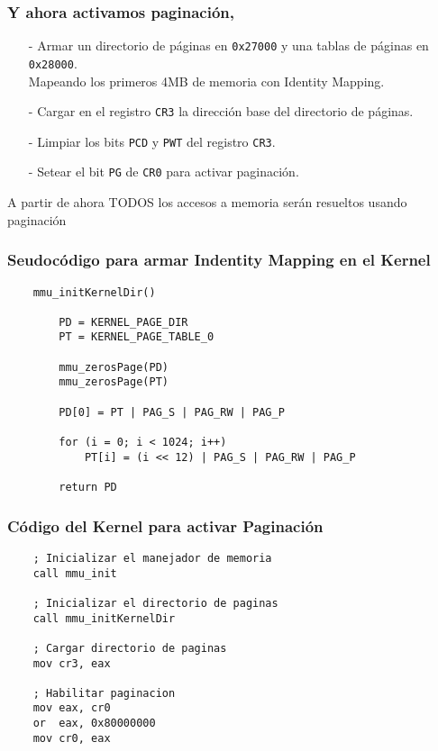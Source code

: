 \documentclass[aspectratio=169]{beamer}
\begin{document}
\begin{frame}
    \frametitle{Y ahora activamos paginación,}
    \begin{itemize}
    \setlength\itemsep{0.7cm}
    \item[-] Armar un directorio de páginas en \texttt{0x27000} y una tablas de páginas en \texttt{0x28000}.\\
    Mapeando los primeros 4MB de memoria con Identity Mapping.
    \pause
    \item[-] Cargar en el registro \texttt{CR3} la dirección base del directorio de páginas.
    \pause
    \item[-] Limpiar los bits \texttt{PCD} y \texttt{PWT} del registro \texttt{CR3}.
    \pause
    \item[-] Setear el bit \texttt{PG} de \texttt{CR0} para activar paginación.
    \end{itemize}
    \pause
    \vspace{0.3cm}
    \begin{center}
    \large
    \textcolor{verdeuca}{A partir de ahora TODOS los accesos a memoria serán resueltos usando paginación}
    \end{center}
\end{frame}

\begin{frame}[fragile]
    \frametitle{Seudocódigo para armar Indentity Mapping en el Kernel}
    \begin{verbatim}
    mmu_initKernelDir()

        PD = KERNEL_PAGE_DIR
        PT = KERNEL_PAGE_TABLE_0

        mmu_zerosPage(PD)
        mmu_zerosPage(PT)
        
        PD[0] = PT | PAG_S | PAG_RW | PAG_P

        for (i = 0; i < 1024; i++)
            PT[i] = (i << 12) | PAG_S | PAG_RW | PAG_P
        
        return PD
    \end{verbatim}
\end{frame}

\begin{frame}[fragile]
    \frametitle{Código del Kernel para activar Paginación}
    \begin{verbatim}
    ; Inicializar el manejador de memoria
    call mmu_init
 
    ; Inicializar el directorio de paginas
    call mmu_initKernelDir

    ; Cargar directorio de paginas
    mov cr3, eax

    ; Habilitar paginacion
    mov eax, cr0
    or  eax, 0x80000000
    mov cr0, eax
    \end{verbatim}
\end{frame}
\end{document}
